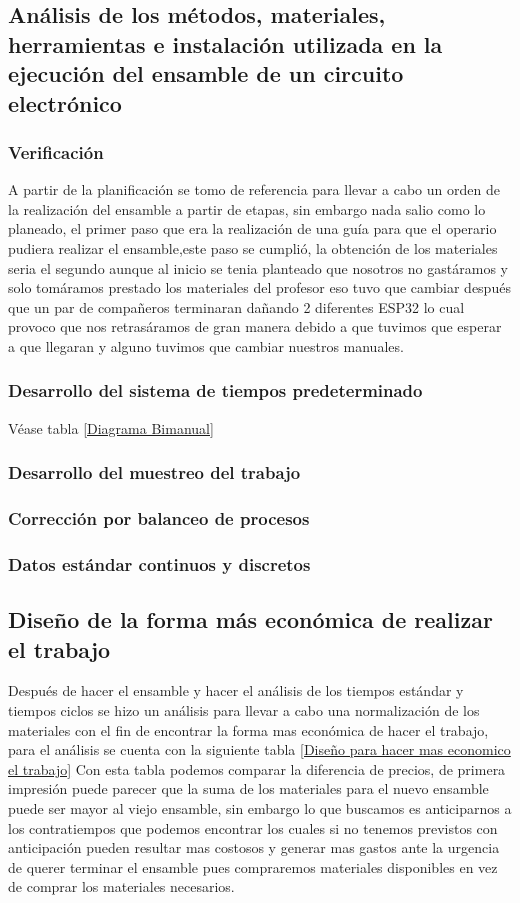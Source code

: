     \subsection{Análisis de los métodos, materiales, herramientas e instalación utilizada en la ejecución del ensamble de un circuito electrónico}
    
    \subsubsection{Verificación}
    A partir de la planificación se tomo de referencia para llevar a cabo un orden de la realización del ensamble a partir de etapas, sin embargo nada salio como lo planeado, el primer paso que era la realización de una guía para que el operario pudiera realizar el ensamble,este paso se cumplió, la obtención de los materiales seria el segundo aunque al inicio se tenia planteado que nosotros no gastáramos y solo tomáramos prestado los materiales del profesor eso tuvo que cambiar después que un par de compañeros terminaran dañando 2 diferentes ESP32 lo cual provoco que nos retrasáramos de gran manera debido a que tuvimos que esperar a que llegaran y alguno tuvimos que cambiar nuestros manuales.
    \subsubsection{Desarrollo del sistema de tiempos predeterminado}
    Véase tabla \ref{Diagrama Bimanual}
    \subsubsection{Desarrollo del muestreo del trabajo}
    \subsubsection{Corrección por balanceo de procesos}
    \subsubsection{Datos estándar continuos y discretos}
    \subsection{Diseño de la forma más económica de realizar el trabajo}
    Después de hacer el ensamble y hacer el análisis de los tiempos estándar y tiempos ciclos se hizo un análisis para llevar a cabo una normalización de los materiales con el fin de encontrar la forma mas económica de hacer el trabajo, para el análisis se cuenta con la siguiente tabla \ref{Diseño para hacer mas economico el trabajo}
    Con esta tabla podemos comparar la diferencia de precios, de primera impresión puede parecer que la suma de los materiales para el nuevo ensamble puede ser mayor al viejo ensamble, sin embargo lo que buscamos es anticiparnos a los contratiempos que podemos encontrar los cuales si no tenemos previstos con anticipación pueden resultar mas costosos y generar mas gastos ante la urgencia de querer terminar el ensamble pues compraremos materiales disponibles en vez de comprar los materiales necesarios.
    
